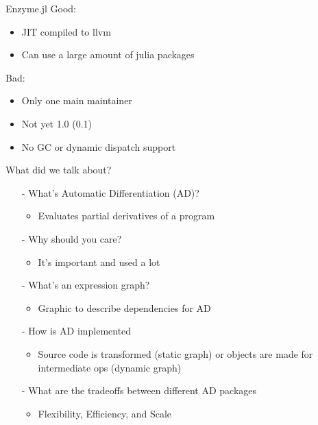 \documentclass[dvipsnames]{beamer}
\begin{document}
\begin{frame}{Enzyme.jl}
Good:
\begin{itemize}
    \item JIT compiled to llvm
    \item Can use a large amount of julia packages
\end{itemize}
Bad:
\begin{itemize}
    \item Only one main maintainer
    \item Not yet 1.0 (0.1)
    \item No GC or dynamic dispatch support
\end{itemize}
\end{frame}
\begin{frame}{What did we talk about?}
   \begin{itemize}
    \item[-] What's Automatic Differentiation (AD)?
    \begin{itemize}
        \item Evaluates partial derivatives of a program
    \end{itemize}
    \item[-] Why should you care?
    \begin{itemize}
        \item It's important and used a lot
    \end{itemize}
    \item[-] What's an expression graph?
    \begin{itemize}
        \item Graphic to describe dependencies for AD
    \end{itemize}
    \item[-] How is AD implemented
    \begin{itemize}
        \item Source code is transformed (static graph) or objects are made for intermediate ops (dynamic graph)
    \end{itemize}
    \item[-] What are the tradeoffs between different AD packages
    \begin{itemize}
        \item Flexibility, Efficiency, and Scale
    \end{itemize}
   \end{itemize}
\end{frame}
\end{document}
